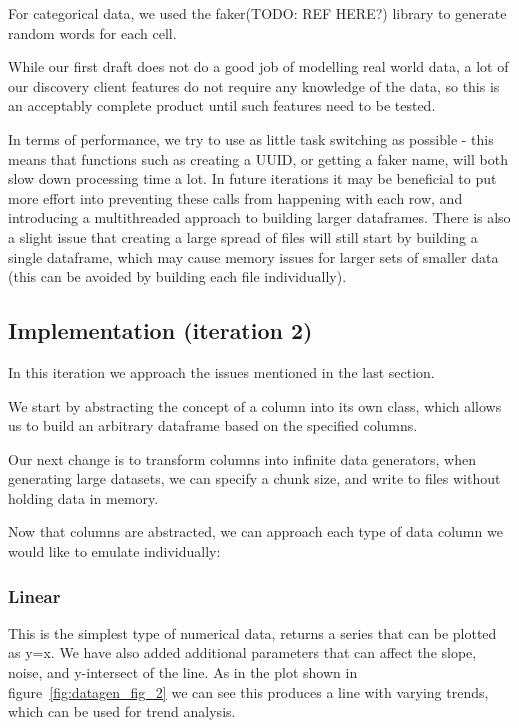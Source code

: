 For categorical data, we used the faker(TODO: REF HERE?) library to generate random words for each cell.

While our first draft does not do a good job of modelling real world data, a lot of our discovery client features do not
require any knowledge of the data, so this is an acceptably complete product until such features need to be tested.

In terms of performance, we try to use as little task switching as possible - this means that functions such as creating
a UUID, or getting a faker name, will both slow down processing time a lot.
In future iterations it may be beneficial to put more effort into preventing these calls from happening with each row,
and introducing a multithreaded approach to building larger dataframes.
There is also a slight issue that creating a large spread of files will still start by building a single dataframe, which
may cause memory issues for larger sets of smaller data (this can be avoided by building each file individually).

\subsection{Implementation (iteration 2)}\label{subsec:implementation-(iteration-2)}

In this iteration we approach the issues mentioned in the last section.

We start by abstracting the concept of a column into its own class, which allows us to build an arbitrary dataframe
based on the specified columns.

Our next change is to transform columns into infinite data generators, when generating large datasets, we can specify
a chunk size, and write to files without holding data in memory.

Now that columns are abstracted, we can approach each type of data column we would like to emulate individually:

\subsubsection{Linear}

This is the simplest type of numerical data, returns a series that can be plotted as y=x.
We have also added additional parameters that can affect the slope, noise, and y-intersect of the line.
As in the plot shown in figure~\ref{fig:datagen_fig_2} we can see this produces a line with varying trends, which can be used
for trend analysis.

